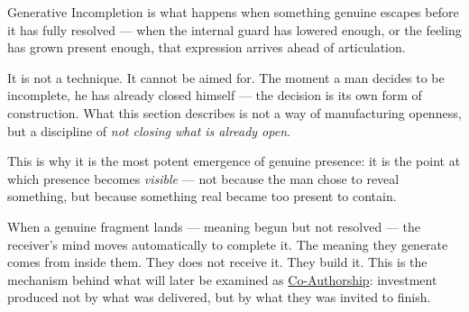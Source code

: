 Generative Incompletion is what happens when something genuine escapes 
before it has fully resolved --- when the internal guard has lowered enough, 
or the feeling has grown present enough, that expression arrives ahead 
of articulation.

It is not a technique. It cannot be aimed for. The moment a man decides 
to be incomplete, he has already closed himself --- the decision is its own 
form of construction. What this section describes is not a way of 
manufacturing openness, but a discipline of \textit{not closing what is 
already open}.

This is why it is the most potent emergence of genuine presence: it is 
the point at which presence becomes \textit{visible} --- not because the 
man chose to reveal something, but because something real became too 
present to contain.

When a genuine fragment lands --- meaning begun but not resolved --- 
the receiver's mind moves automatically to complete it. The meaning they 
generate comes from inside them. They does not receive it. They build it. 
This is the mechanism behind what will later be examined as 
\hyperref[sec:co_authorship]{Co-Authorship}: investment produced not 
by what was delivered, but by what they was invited to finish.